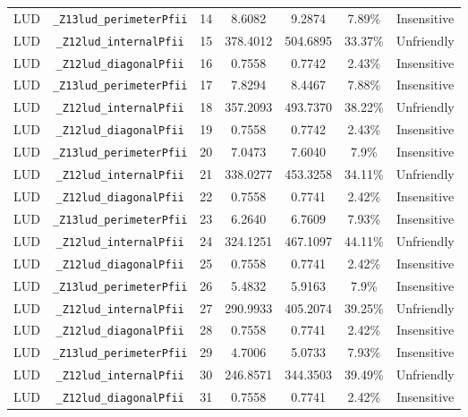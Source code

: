 \documentclass{article}
\begin{document}
\begin{table}[H]
\begin{tabular}{c c c c c c c}
LUD & \verb|_Z13lud_perimeterPfii|                   & 14 & 8.6082    & 9.2874   & 7.89\% &Insensitive\\
LUD & \verb|_Z12lud_internalPfii|                    & 15 & 378.4012  & 504.6895 & 33.37\% &Unfriendly\\
LUD & \verb|_Z12lud_diagonalPfii|                    & 16 & 0.7558    & 0.7742   & 2.43\% &Insensitive\\
LUD & \verb|_Z13lud_perimeterPfii|                   & 17 & 7.8294    & 8.4467   & 7.88\% &Insensitive\\
LUD & \verb|_Z12lud_internalPfii|                    & 18 & 357.2093  & 493.7370 & 38.22\% &Unfriendly\\
LUD & \verb|_Z12lud_diagonalPfii|                    & 19 & 0.7558    & 0.7742   & 2.43\% &Insensitive\\
LUD & \verb|_Z13lud_perimeterPfii|                   & 20 & 7.0473    & 7.6040   & 7.9\% &Insensitive\\
LUD & \verb|_Z12lud_internalPfii|                    & 21 & 338.0277  & 453.3258 & 34.11\% &Unfriendly\\
LUD & \verb|_Z12lud_diagonalPfii|                    & 22 & 0.7558    & 0.7741   & 2.42\% &Insensitive\\
LUD & \verb|_Z13lud_perimeterPfii|                   & 23 & 6.2640    & 6.7609   & 7.93\% &Insensitive\\
LUD & \verb|_Z12lud_internalPfii|                    & 24 & 324.1251  & 467.1097 & 44.11\% &Unfriendly\\
LUD & \verb|_Z12lud_diagonalPfii|                    & 25 & 0.7558    & 0.7741   & 2.42\% &Insensitive\\
LUD & \verb|_Z13lud_perimeterPfii|                   & 26 & 5.4832    & 5.9163   & 7.9\% &Insensitive\\
LUD & \verb|_Z12lud_internalPfii|                    & 27 & 290.9933  & 405.2074 & 39.25\% &Unfriendly\\
LUD & \verb|_Z12lud_diagonalPfii|                    & 28 & 0.7558    & 0.7741   & 2.42\% &Insensitive\\
LUD & \verb|_Z13lud_perimeterPfii|                   & 29 & 4.7006    & 5.0733   & 7.93\% &Insensitive\\
LUD & \verb|_Z12lud_internalPfii|                    & 30 & 246.8571  & 344.3503 & 39.49\% &Unfriendly\\
LUD & \verb|_Z12lud_diagonalPfii|                    & 31 & 0.7558    & 0.7741   & 2.42\% &Insensitive\\

\end{tabular}
\end{table}
\end{document}
